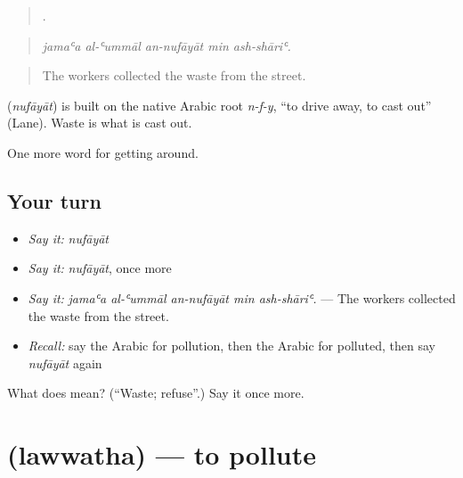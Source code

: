 \begin{quote}
    .
\end{quote}

\begin{quote}
\emph{jamaʿa al-ʿummāl an-nufāyāt min ash-shāriʿ.}
\end{quote}

\begin{quote}
The workers collected the waste from the street.
\end{quote}

\begin{cousinweb}
\textbf{} (\emph{nufāyāt}) is built on the native Arabic root \emph{n-f-y}, \textquotedblleft{}to drive away, to cast out\textquotedblright{} (Lane). Waste is what is cast out.
\end{cousinweb}

\begin{grammarlens}[title={What you've built}]
One more word for getting around.
\end{grammarlens}

\subsection*{Your turn}
\begin{itemize}
\raggedright
  \item \emph{Say it:} \emph{nufāyāt}
  \item \emph{Say it:} \emph{nufāyāt}, once more
  \item \emph{Say it:} \emph{jamaʿa al-ʿummāl an-nufāyāt min ash-shāriʿ.} — The workers collected the waste from the street.
  \item \emph{Recall:} say the Arabic for pollution, then the Arabic for polluted, then say \emph{nufāyāt} again
\end{itemize}

\begin{tcolorbox}[breakable,colback=teal!4,colframe=teal!35!black,title={Before you move on}]
What does  mean? (\textquotedblleft{}Waste; refuse\textquotedblright{}.) Say it once more.
\end{tcolorbox}
\section[\texorpdfstring{\ar{لوث} (lawwatha)}{لوث (lawwatha)}]{ (lawwatha) — to pollute}

\label{lesson:AR-C464-lawwatha}



